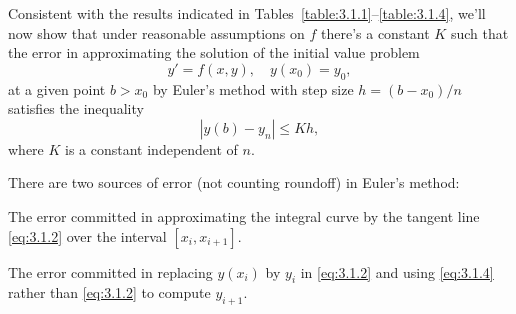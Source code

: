 \noindent
Consistent with the results indicated in Tables~\ref{table:3.1.1}--\ref{table:3.1.4}, we'll now show
that under reasonable assumptions on $f$ there's a constant $K$ such that the error in approximating
the solution of the initial value problem
\[
  y'=f(x,y),\quad y(x_{0})=y_{0},
\]
at a given point $b>x_{0}$ by Euler's method with step size $h=(b-x_{0})/n$ satisfies the inequality
\[
  |y(b)-y_{n}|\le Kh,
\]
where $K$ is a constant independent of $n$.

There are two sources of error (not counting roundoff) in Euler's method:
\begin{numberlist}
  \item %
  The error committed in approximating the integral curve by the tangent line \eqref{eq:3.1.2} over
  the interval $[x_{i},x_{i+1}]$.

  \item %
  The error committed in replacing $y(x_{i})$ by $y_{i}$ in \eqref{eq:3.1.2} and using
  \eqref{eq:3.1.4} rather than \eqref{eq:3.1.2} to compute $y_{i+1}$.
\end{numberlist}

